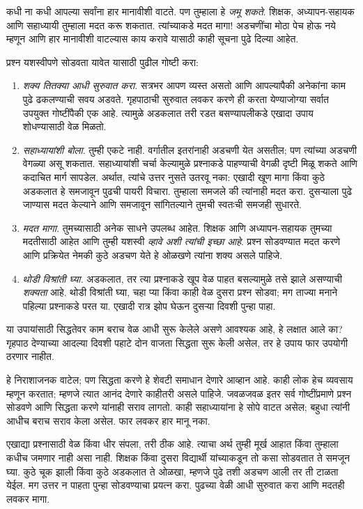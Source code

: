 \documentclass[../../../include/open-logic-section]{subfiles}
\begin{document}


कधी ना कधी आपल्या सर्वांना हार मानावीशी वाटते. पण तुम्हाला हे \emph{जमू शकते}. शिक्षक, अध्यापन-सहायक आणि सहाध्यायी तुम्हाला मदत करू शकतात. त्यांच्याकडे मदत मागा!{} अडचणींचा मोठा पेच होऊ नये म्हणून आणि हार मानावीशी वाटल्यास काय करावे यासाठी काही सूचना पुढे दिल्या आहेत.

प्रश्न यशस्वीपणे सोडवता यावेत यासाठी पुढील गोष्टी करा:
\begin{enumerate}
\item \emph{शक्य तितक्या आधी सुरुवात करा.} सत्रभर आपण व्यस्त असतो आणि आपल्यापैकी अनेकांना काम पुढे ढकलण्याची सवय अडवते. गृहपाठाची सुरुवात लवकर करणे ही करता येण्याजोग्या सर्वात उपयुक्त गोष्टींपैकी एक आहे. त्यामुळे अडकलात तरी रडत बसण्यापलीकडे एखादा उपाय शोधण्यासाठी वेळ मिळतो.
\item \emph{सहाध्यायांशी बोला}. तुम्ही एकटे नाही. वर्गातील इतरांनाही अडचणी येत असतील; पण त्यांच्या अडचणी वेगळ्या असू शकतात. सहाध्यायांशी चर्चा केल्यामुळे प्रश्नाकडे पाहण्याची वेगळी दृष्टी मिळू शकते आणि कदाचित मार्ग सापडेल. अर्थात, त्यांचे उत्तर नुसते उतरवू नका: एखादी खूण मागा किंवा कुठे अडकलात हे समजावून पुढची पायरी विचारा. तुम्हाला समजले की त्यांनाही मदत करा. दुसऱ्याला पुढे जाण्यास मदत केल्याने आणि समजावून सांगितल्याने तुमची स्वतःची समजही सुधारते.
\item \emph{मदत मागा.} तुमच्यासाठी अनेक साधने उपलब्ध आहेत. शिक्षक आणि अध्यापन-सहायक तुमच्या मदतीसाठी आहेत आणि तुम्ही यशस्वी \emph{व्हावे अशी त्यांची इच्छा आहे}. प्रश्न सोडवण्यात मदत करणे आणि प्रक्रियेत नेमकी कुठे अडचण येते हे ओळखणे त्यांना शक्य असले पाहिजे.
\item \emph{थोडी विश्रांती घ्या.} अडकलात, तर त्या प्रश्नाकडे खूप वेळ पाहत बसल्यामुळे तसे झाले असण्याची \emph{शक्यता} आहे. थोडी विश्रांती घ्या, चहा प्या किंवा काही वेळ दुसरा प्रश्न सोडवा; मग ताज्या मनाने पहिल्या प्रश्नाकडे परत या. एखादी रात्र झोप घेऊन दुसऱ्या दिवशी पुन्हा पाहा.
\end{enumerate}

या उपायांसाठी सिद्धतेवर काम बराच वेळ आधी सुरू केलेले असणे आवश्यक आहे, हे लक्षात आले का? गृहपाठ देण्याच्या आदल्या दिवशी पहाटे दोन वाजता सिद्धता सुरू केली असेल, तर हे उपाय फार उपयोगी ठरणार नाहीत.

हे निराशाजनक वाटेल; पण सिद्धता करणे हे शेवटी समाधान देणारे आव्हान आहे. काही लोक हेच व्यवसाय म्हणून करतात; म्हणजे त्यात आनंद देणारे काहीतरी असले पाहिजे. जवळजवळ इतर सर्व गोष्टींप्रमाणे प्रश्न सोडवणे आणि सिद्धता करणे यांनाही सराव लागतो. काही सहाध्यायांना हे सोपे वाटत असेल; बहुधा त्यांनी आधीच बराच सराव केला असेल. फार लवकर हार मानू नका.

एखाद्या प्रश्नासाठी वेळ किंवा धीर संपला, तरी ठीक आहे. त्याचा अर्थ तुम्ही मूर्ख आहात किंवा तुम्हाला कधीच जमणार नाही असा नाही. शिक्षक किंवा दुसरा विद्यार्थी यांच्याकडून तो कसा सोडवतात ते समजून घ्या. कुठे चूक झाली किंवा कुठे अडकलात ते ओळखा, म्हणजे पुढे तशी अडचण आली तर ती टाळता येईल. मग उत्तर न पाहता पुन्हा सोडवण्याचा प्रयत्न करा. पुढच्या वेळी आधी सुरुवात करा आणि मदतही लवकर मागा.
\end{document}
